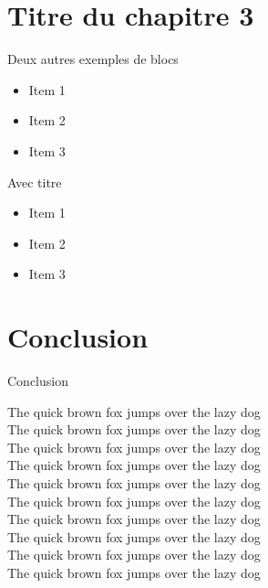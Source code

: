 \documentclass[A4,svgnames,9pt,aspectratio=169]{beamer}
\begin{document}

\section{Titre du chapitre 3}
\frame{\sectionpage}


\begin{frame}{Deux autres exemples de blocs}
    \begin{exampleblock}{}
      \begin{itemize}
        \item{Item 1 }
        \item {Item 2}
        \item {Item 3}
      \end{itemize}
    \end{exampleblock}
    \begin{exampleblock}{Avec titre}
      \begin{itemize}
        \item{Item 1 }
        \item {Item 2}
        \item {Item 3}
      \end{itemize}
    \end{exampleblock}
\end{frame}


\section{Conclusion}
\begin{frame}{Conclusion}

    {\tiny         The quick brown fox jumps over the lazy dog}\\
    {\scriptsize   The quick brown fox jumps over the lazy dog}\\
    {\footnotesize The quick brown fox jumps over the lazy dog}\\
    {\small        The quick brown fox jumps over the lazy dog}\\
    {\normalsize   The quick brown fox jumps over the lazy dog}\\
    {\large        The quick brown fox jumps over the lazy dog}\\
    {\Large        The quick brown fox jumps over the lazy dog}\\
    {\LARGE        The quick brown fox jumps over the lazy dog}\\
    {\huge         The quick brown fox jumps over the lazy dog}\\
    {\Huge         The quick brown fox jumps over the lazy dog}

\end{frame}


\frame{\merci}

\end{document}
